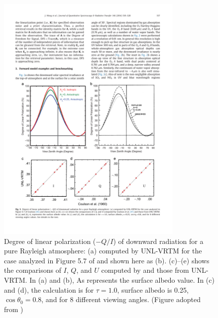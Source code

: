 \begin{figure}[t]
  \centering
  \includegraphics[width={0.8\textwidth}]{figures/unlvrtm2.pdf}
  \caption{Degree of linear polarization ($-Q/I$) of downward radiation
for a pure Rayleigh atmosphere: (a) computed by UNL-VRTM for the case
analyzed in Figure 5.7 of \citet{Coulson88} and shown here as (b). (c)--(e)
shows the comparisons of $I$, $Q$, and $U$ computed by \citet{Coulson60} and
those from UNL-VRTM. In (a) and (b), As represents the surface albedo
value. In (c) and (d), the calculation is for $\tau=1.0$, surface albedo
is 0.25, $\cos{\theta_0}=0.8$, and for 8 different viewing angles.
(Figure adopted from \citet{Wang14}) }
  \label{fig:unlvrtm2}
\end{figure}

